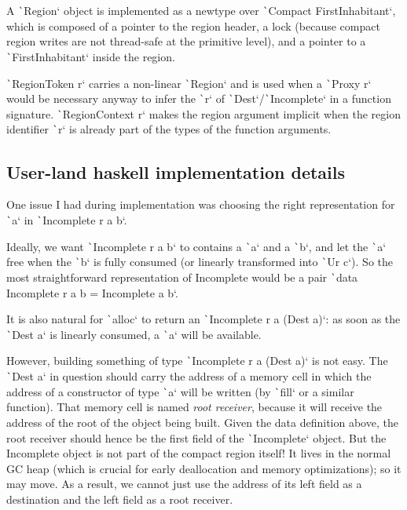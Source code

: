 \documentclass[english]{jflart}
\begin{document}
A \texttt`Region` object is implemented as a newtype over \texttt`Compact FirstInhabitant`, which is composed of a pointer to the region header, a lock (because compact region writes are not thread-safe at the primitive level), and a pointer to a \texttt`FirstInhabitant` inside the region.

\texttt`RegionToken r` carries a non-linear \texttt`Region` and is used when a \texttt`Proxy r` would be necessary anyway to infer the \texttt`r` of \texttt`Dest`/\texttt`Incomplete` in a function signature. \texttt`RegionContext r` makes the region argument implicit when the region identifier \texttt`r` is already part of the types of the function arguments.

\subsection{User-land haskell implementation details}
 
One issue I had during implementation was choosing the right representation for \texttt`a` in \texttt`Incomplete r a b`.

Ideally, we want \texttt`Incomplete r a b` to contains a \texttt`a` and a \texttt`b`, and let the \texttt`a` free when the \texttt`b` is fully consumed (or linearly transformed into \texttt`Ur c`). So the most straightforward representation of Incomplete would be a pair \texttt`data Incomplete r a b = Incomplete a b`.

It is also natural for \texttt`alloc` to return an \texttt`Incomplete r a (Dest a)`: as soon as the \texttt`Dest a` is linearly consumed, a \texttt`a` will be available.

However, building something of type \texttt`Incomplete r a (Dest a)` is not easy. The \texttt`Dest a` in question should carry the address of a memory cell in which the address of a constructor of type \texttt`a` will be written (by \texttt`fill` or a similar function). That memory cell is named \emph{root receiver}, because it will receive the address of the root of the object being built. Given the data definition above, the root receiver should hence be the first field of the \texttt`Incomplete` object. But the Incomplete object is not part of the compact region itself! It lives in the normal GC heap (which is crucial for early deallocation and memory optimizations); so it may move. As a result, we cannot just use the address of its left field as a destination and the left field as a root receiver.
\end{document}
